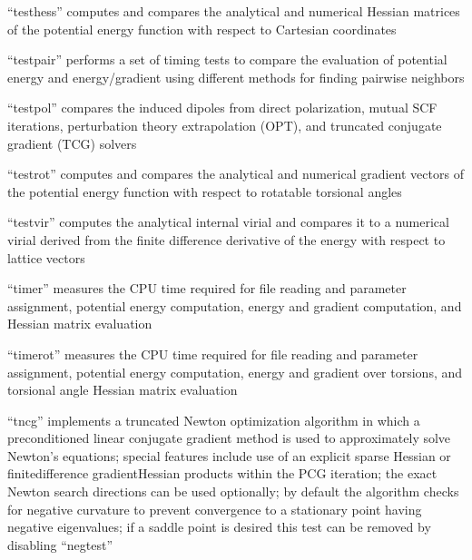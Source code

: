 \documentclass[letterpaper,11pt,english]{sphinxmanual}
\begin{document}

“testhess” computes and compares the analytical and numerical
Hessian matrices of the potential energy function with respect
to Cartesian coordinates


“testpair” performs a set of timing tests to compare the
evaluation of potential energy and energy/gradient using
different methods for finding pairwise neighbors


“testpol” compares the induced dipoles from direct polarization,
mutual SCF iterations, perturbation theory extrapolation (OPT),
and truncated conjugate gradient (TCG) solvers


“testrot” computes and compares the analytical and numerical
gradient vectors of the potential energy function with respect
to rotatable torsional angles


“testvir” computes the analytical internal virial and compares
it to a numerical virial derived from the finite difference
derivative of the energy with respect to lattice vectors


“timer” measures the CPU time required for file reading and
parameter assignment, potential energy computation, energy
and gradient computation, and Hessian matrix evaluation


“timerot” measures the CPU time required for file reading
and parameter assignment, potential energy computation,
energy and gradient over torsions, and torsional angle
Hessian matrix evaluation


“tncg” implements a truncated Newton optimization algorithm
in which a preconditioned linear conjugate gradient method is
used to approximately solve Newton’s equations; special features
include use of an explicit sparse Hessian or finite\sphinxhyphen{}difference
gradient\sphinxhyphen{}Hessian products within the PCG iteration; the exact
Newton search directions can be used optionally; by default the
algorithm checks for negative curvature to prevent convergence
to a stationary point having negative eigenvalues; if a saddle
point is desired this test can be removed by disabling “negtest”
\end{document}
